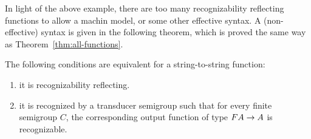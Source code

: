 In light of the above example, there are too many recognizability reflecting functions to allow a machin model, or some other effective syntax. A (non-effective) syntax is given in the following theorem, which is proved the same way as Theorem~\ref{thm:all-functions}.

\begin{theorem}\label{thm:reco-reflecting-functions} The following conditions are equivalent for a string-to-string function:
 \begin{enumerate}
 \item \label{it:reco-refl} it is recognizability reflecting.
 \item \label{it:trans-semig-reco}it is recognized by a transducer semigroup such that for every finite semigroup $C$, the corresponding output function of type 
 $\functor A \to A$
 is recognizable.
 \end{enumerate}
\end{theorem}
